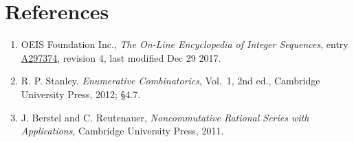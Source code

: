 \documentclass[11pt]{article}
\theoremstyle{definition}
\begin{document}
\section{References}

\begin{enumerate}

\item OEIS Foundation Inc., \emph{The On-Line Encyclopedia of Integer Sequences}, entry \href{https://oeis.org/A297374}{A297374}, revision 4, last modified Dec 29 2017.

\item R. P. Stanley, \emph{Enumerative Combinatorics}, Vol.~1, 2nd ed., Cambridge University Press, 2012; \S4.7.

\item J. Berstel and C. Reutenauer, \emph{Noncommutative Rational Series with Applications}, Cambridge University Press, 2011.

\end{enumerate}
\end{document}
